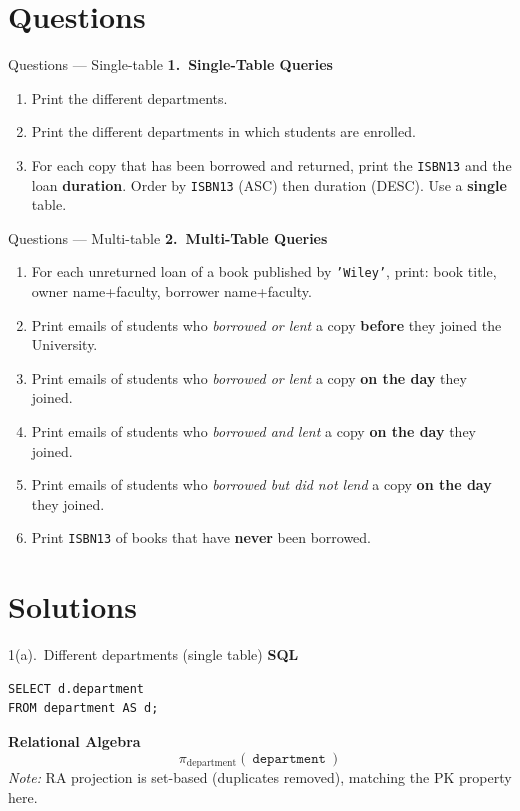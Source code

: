 \documentclass{beamer}
\begin{document}
\section{Questions}
\begin{frame}{Questions — Single-table}
\footnotesize
\textbf{1.\ Single-Table Queries}
\begin{enumerate}\itemsep2pt
  \item[(a)] Print the different departments.
  \item[(b)] Print the different departments in which students are enrolled.
  \item[(c)] For each copy that has been borrowed and returned, print the \texttt{ISBN13} and the loan \textbf{duration}. Order by \texttt{ISBN13} (ASC) then duration (DESC). Use a \textbf{single} table.
\end{enumerate}
\end{frame}

\begin{frame}{Questions — Multi-table}
\footnotesize
\textbf{2.\ Multi-Table Queries}
\begin{enumerate}\itemsep2pt
  \item[(a)] For each unreturned loan of a book published by \texttt{'Wiley'}, print: book title, owner name+faculty, borrower name+faculty.
  \item[(b)] Print emails of students who \emph{borrowed or lent} a copy \textbf{before} they joined the University.
  \item[(c)] Print emails of students who \emph{borrowed or lent} a copy \textbf{on the day} they joined.
  \item[(d)] Print emails of students who \emph{borrowed and lent} a copy \textbf{on the day} they joined.
  \item[(e)] Print emails of students who \emph{borrowed but did not lend} a copy \textbf{on the day} they joined.
  \item[(f)] Print \texttt{ISBN13} of books that have \textbf{never} been borrowed.
\end{enumerate}
\end{frame}

\section{Solutions}

\begin{frame}[fragile]{1(a).\ Different departments (single table)}
\small
\textbf{SQL}
\begin{lstlisting}
SELECT d.department
FROM department AS d;
\end{lstlisting}

\medskip
\textbf{Relational Algebra}
\[
\pi_{\text{department}}(\ \texttt{department}\ )
\]
\textit{Note:} RA projection is set-based (duplicates removed), matching the PK property here.
\end{frame}
\end{document}
